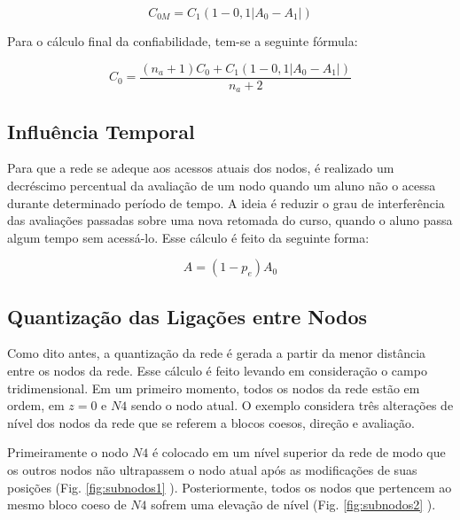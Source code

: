 \begin{equation}
	C_{0M} = C_1 (1-0,1|A_0 -  A_1 |) 
\end{equation}

Para o cálculo final da confiabilidade, tem-se a seguinte fórmula:

\begin{equation}
	C_0 = \frac{(n_a+1) C_0 + C_1 (1 - 0,1|A_0 - A_1|)}{ n_a+2 }
\end{equation}

\subsection{Influência Temporal}

Para que a rede se adeque aos acessos atuais dos nodos, é realizado um decréscimo percentual da avaliação de um nodo quando um aluno não o acessa durante determinado período de tempo. A ideia é reduzir o grau de interferência das avaliações passadas sobre uma nova retomada do curso, quando o aluno passa algum tempo sem acessá-lo. Esse cálculo é feito da seguinte forma:

\begin{equation}
	A=(1 - p_e)A_0 
\end{equation}

\subsection{Quantização das Ligações entre Nodos}

Como dito antes, a quantização da rede é gerada a partir da menor distância entre os nodos da rede. Esse cálculo é feito levando em consideração o campo tridimensional. Em um primeiro momento, todos os nodos da rede estão em ordem, em \(z=0\) e \(N4\) sendo o nodo atual. O exemplo considera três alterações de nível dos nodos da rede que se referem a blocos coesos, direção e avaliação.

Primeiramente o nodo \(N4\) é colocado em um nível superior da rede de modo que os outros nodos não ultrapassem o nodo atual após as modificações de suas posições (Fig. \ref{fig:subnodos1} ). Posteriormente, todos os nodos que pertencem ao mesmo bloco coeso de \(N4\) sofrem uma elevação de nível (Fig. \ref{fig:subnodos2} ).

